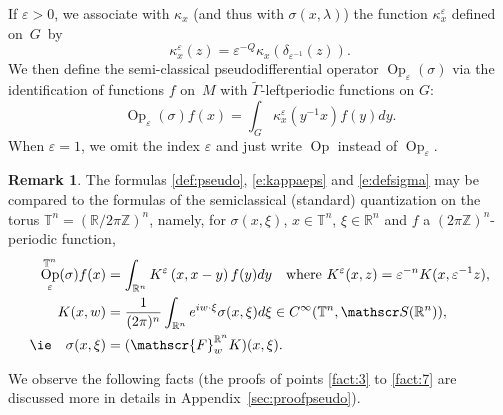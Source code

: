 \documentclass[JEP,XML,SOM,Unicode,published]{cedram}
\let\mathcal\mathscr
\DeclareMathOperator{\Op}{Op}
\theoremstyle{plain}
\theoremstyle{definition}
\newtheorem{remark}[theorem]{Remark}
\let\eps\varepsilon
\def\R{{\mathbb R}}
\def\Z{{\mathbb Z}}
\def\T{{\mathbb T}}
\begin{document}
If $\eps\!>\!0$, we associate with $\kappa_x$ (and thus with $\sigma(x,\lambda)$) the function $\kappa_x^\eps$ defined on~$G$~by
\begin{equation} \label{e:kappaeps}
\kappa^\eps_x(z)= \eps^{-Q} \kappa_x(\delta_{\eps^{-1}}(z)).
\end{equation}
We then define the semi-classical pseudodifferential operator $\Op_\eps(\sigma)$ via the identification of functions $f$ on~$M$ with $\widetilde{\Gamma}$-leftperiodic functions on $G$:
\begin{equation}\label{def:pseudo}
\Op_\eps(\sigma)f(x)= \int_{ G} \kappa_x^\eps(y^{-1} x) f(y)dy.
\end{equation}
When $\eps=1$, we omit the index $\eps$ and just write $\Op$ instead of $\Op_\eps$.
\begin{remark}
The formulas \eqref{def:pseudo}, \eqref{e:kappaeps} and \eqref{e:defsigma} may be compared to the formulas of the semiclassical (standard) quantization on the torus $\T^n= (\R/2\pi\Z)^{n}$, namely, for $\sigma(x,\xi)$, $x\in\T^n$, $\xi\in\R^n$ and $f$ a $(2\pi\Z)^n$-periodic function,
\begin{align*}
\Op_\eps^{\T^n}(\sigma)f(x)&=\int_{\R^n}K^\eps\left(x,x-y\right)f(y)dy\quad
\text{where } K^\eps(x,z)=\eps^{-n}K(x,\eps^{-1}z), \\
K(x,w)&=\frac{1}{(2\pi)^n}\int_{\R^n}e^{iw\cdot\xi} \sigma(x,\xi)d\xi\in C^\infty(\T^n,\mathcal S(\R^n)), \\
\text{\ie} \quad \sigma(x,\xi)&=(\mathcal{F}^{\R^n}_w K)(x,\xi).
\end{align*}
\end{remark}

We observe the following facts (the proofs of points \eqref{fact:3} to \eqref{fact:7} are discussed more in details in Appendix~\ref{sec:proofpseudo}).
\end{document}
